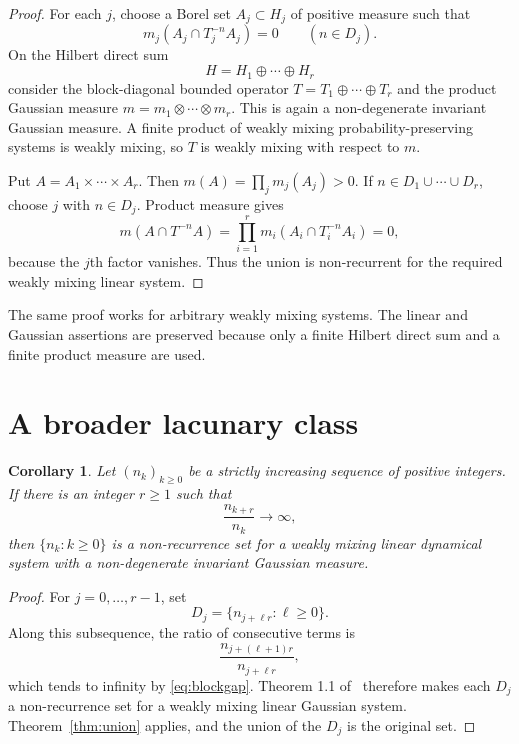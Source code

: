 \documentclass[11pt]{article}
\newtheorem{corollary}[theorem]{Corollary}
\begin{document}
\begin{proof}
For each $j$, choose a Borel set $A_j\subset H_j$ of positive measure such
that
\[
 m_j(A_j\cap T_j^{-n}A_j)=0\qquad(n\in D_j).
\]
On the Hilbert direct sum
\[
 H=H_1\oplus\cdots\oplus H_r
\]
consider the block-diagonal bounded operator
$T=T_1\oplus\cdots\oplus T_r$ and the product Gaussian measure
$m=m_1\otimes\cdots\otimes m_r$.  This is again a non-degenerate invariant
Gaussian measure.  A finite product of weakly mixing probability-preserving
systems is weakly mixing, so $T$ is weakly mixing with respect to $m$.

Put $A=A_1\times\cdots\times A_r$.  Then
$m(A)=\prod_jm_j(A_j)>0$.  If $n\in D_1\cup\cdots\cup D_r$, choose $j$ with
$n\in D_j$.  Product measure gives
\[
 m(A\cap T^{-n}A)
 =\prod_{i=1}^r m_i(A_i\cap T_i^{-n}A_i)=0,
\]
because the $j$th factor vanishes.  Thus the union is non-recurrent for the
required weakly mixing linear system.
\end{proof}

The same proof works for arbitrary weakly mixing systems.  The linear and
Gaussian assertions are preserved because only a finite Hilbert direct sum
and a finite product measure are used.

\section{A broader lacunary class}

\begin{corollary}\label{cor:gap}
Let $(n_k)_{k\ge0}$ be a strictly increasing sequence of positive integers.
If there is an integer $r\ge1$ such that
\begin{equation}\label{eq:blockgap}
 \frac{n_{k+r}}{n_k}\longrightarrow\infty,
\end{equation}
then $\{n_k:k\ge0\}$ is a non-recurrence set for a weakly mixing linear
dynamical system with a non-degenerate invariant Gaussian measure.
\end{corollary}

\begin{proof}
For $j=0,\ldots,r-1$, set
\[
 D_j=\{n_{j+\ell r}:\ell\ge0\}.
\]
Along this subsequence, the ratio of consecutive terms is
\[
 \frac{n_{j+(\ell+1)r}}{n_{j+\ell r}},
\]
which tends to infinity by \eqref{eq:blockgap}.  Theorem 1.1 of~\cite{G}
therefore makes each $D_j$ a non-recurrence set for a weakly mixing linear
Gaussian system.  Theorem~\ref{thm:union} applies, and the union of the
$D_j$ is the original set.
\end{proof}
\end{document}
